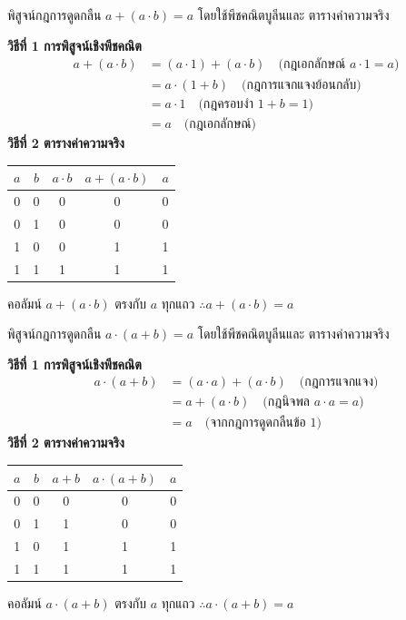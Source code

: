 \begin{ex}
\label{ex:absorption-law-1}
พิสูจน์กฎการดูดกลืน $a + (a \cdot b) = a$ โดยใช้พีชคณิตบูลีนและ ตารางค่าความจริง
\end{ex}
\begin{solution}
\textbf{วิธีที่ 1 การพิสูจน์เชิงพีชคณิต}
\begin{align*}
a + (a \cdot b) &= (a \cdot 1) + (a \cdot b) \quad \text{(กฎเอกลักษณ์ } a \cdot 1 = a\text{)} \\
                &= a \cdot (1 + b) \quad \text{(กฎการแจกแจงย้อนกลับ)} \\
                &= a \cdot 1 \quad \text{(กฎครอบงำ } 1 + b = 1\text{)} \\
                &= a \quad \text{(กฎเอกลักษณ์)}
\end{align*}
\textbf{วิธีที่ 2 ตารางค่าความจริง}
\begin{center}
\begin{tabular}{|c|c|c|c|c|}
\hline
$a$ & $b$ & $a \cdot b$ & $a + (a \cdot b)$ & $a$ \\
\hline
0 & 0 & 0 & 0 & 0 \\
\hline
0 & 1 & 0 & 0 & 0 \\
\hline
1 & 0 & 0 & 1 & 1 \\
\hline
1 & 1 & 1 & 1 & 1 \\
\hline
\end{tabular}
\end{center}
คอลัมน์ $a + (a \cdot b)$ ตรงกับ $a$ ทุกแถว $\therefore a + (a \cdot b) = a$ \solhere
\end{solution}

\begin{ex}
\label{ex:absorption-law-2}
พิสูจน์กฎการดูดกลืน $a \cdot (a + b) = a$ โดยใช้พีชคณิตบูลีนและ ตารางค่าความจริง
\end{ex}
\begin{solution}
\textbf{วิธีที่ 1 การพิสูจน์เชิงพีชคณิต}
\begin{align*}
a \cdot (a + b) &= (a \cdot a) + (a \cdot b) \quad \text{(กฎการแจกแจง)} \\
                &= a + (a \cdot b) \quad \text{(กฎนิจพล } a \cdot a = a\text{)} \\
                &= a \quad \text{(จากกฎการดูดกลืนข้อ 1)}
\end{align*}
\textbf{วิธีที่ 2 ตารางค่าความจริง}
\begin{center}
\begin{tabular}{|c|c|c|c|c|}
\hline
$a$ & $b$ & $a + b$ & $a \cdot (a + b)$ & $a$ \\
\hline
0 & 0 & 0 & 0 & 0 \\
\hline
0 & 1 & 1 & 0 & 0 \\
\hline
1 & 0 & 1 & 1 & 1 \\
\hline
1 & 1 & 1 & 1 & 1 \\
\hline
\end{tabular}
\end{center}
คอลัมน์ $a \cdot (a + b)$ ตรงกับ $a$ ทุกแถว $\therefore a \cdot (a + b) = a$ \solhere
\end{solution}

